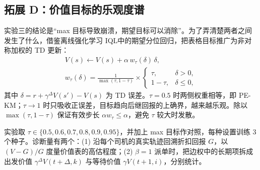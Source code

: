 \subsection{拓展 D：价值目标的乐观度谱}\label{sec:expectile}

实验三的结论是“max 目标导致崩溃，期望目标可以消除”。为了弄清楚两者之间发生了什么，借鉴离线强化学习 IQL\cite{kostrikov2022offline}中的期望分位回归\cite{newey1987asymmetric}，把表格目标推广为非对称加权的 TD 更新：
\begin{gather}
V(s)\leftarrow V(s)+\alpha\,w_\tau(\delta)\,\delta,\\
w_\tau(\delta)=\frac{1}{\max(\tau,1-\tau)}\times
\begin{cases}
\tau, & \delta>0,\\
1-\tau, & \delta\le0,
\end{cases}
\end{gather}
其中 $\delta=r+\gamma^{\Delta}V(s')-V(s)$ 为 TD 误差。$\tau=0.5$ 时两侧权重相等，即 PE-KM；$\tau\to1$ 时只吸收正误差，目标趋向后继回报的上确界，越来越乐观。除以 $\max(\tau,1-\tau)$ 保证有效步长 $\alpha w_\tau\le\alpha$，避免 $\tau$ 较大时发散。

实验取 $\tau\in\{0.5,0.6,0.7,0.8,0.9,0.95\}$，并加上 max 目标作对照，每种设置训练 3 个种子。诊断量有两个：(1) 沿每个司机的真实轨迹回溯折扣回报 $G$，以 $(V-G)/G$ 度量价值表的高估程度；(2) $\beta=1$ 派单时，把边权中的长期项拆成出发价值 $\gamma^{\Delta}V(t{+}\Delta,k)$ 与等待价值 $\gamma V(t{+}1,i)$，分别统计。
